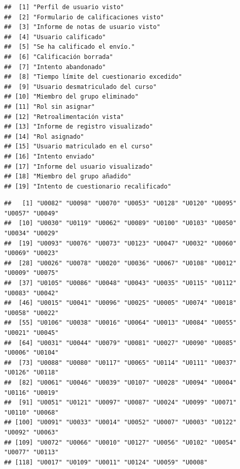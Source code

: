 \documentclass[]{elsarticle} %
\newenvironment{Shaded}{\begin{snugshade}}{\end{snugshade}}
\newcommand{\FunctionTok}[1]{\textcolor[rgb]{0.13,0.29,0.53}{\textbf{#1}}}
\newcommand{\NormalTok}[1]{#1}
\newcommand{\SpecialCharTok}[1]{\textcolor[rgb]{0.81,0.36,0.00}{\textbf{#1}}}
\newcommand{\StringTok}[1]{\textcolor[rgb]{0.31,0.60,0.02}{#1}}
\begin{document}
\begin{verbatim}
##  [1] "Perfil de usuario visto"                
##  [2] "Formulario de calificaciones visto"     
##  [3] "Informe de notas de usuario visto"      
##  [4] "Usuario calificado"                     
##  [5] "Se ha calificado el envío."             
##  [6] "Calificación borrada"                   
##  [7] "Intento abandonado"                     
##  [8] "Tiempo límite del cuestionario excedido"
##  [9] "Usuario desmatriculado del curso"       
## [10] "Miembro del grupo eliminado"            
## [11] "Rol sin asignar"                        
## [12] "Retroalimentación vista"                
## [13] "Informe de registro visualizado"        
## [14] "Rol asignado"                           
## [15] "Usuario matriculado en el curso"        
## [16] "Intento enviado"                        
## [17] "Informe del usuario visualizado"        
## [18] "Miembro del grupo añadido"              
## [19] "Intento de cuestionario recalificado"
\end{verbatim}

\begin{Shaded}
\end{Shaded}

\begin{verbatim}
##   [1] "U0082" "U0098" "U0070" "U0053" "U0128" "U0120" "U0095" "U0057" "U0049"
##  [10] "U0030" "U0119" "U0062" "U0089" "U0100" "U0103" "U0050" "U0034" "U0029"
##  [19] "U0093" "U0076" "U0073" "U0123" "U0047" "U0032" "U0060" "U0069" "U0023"
##  [28] "U0026" "U0078" "U0020" "U0036" "U0067" "U0108" "U0012" "U0009" "U0075"
##  [37] "U0105" "U0086" "U0048" "U0043" "U0035" "U0115" "U0112" "U0083" "U0042"
##  [46] "U0015" "U0041" "U0096" "U0025" "U0005" "U0074" "U0018" "U0058" "U0022"
##  [55] "U0106" "U0038" "U0016" "U0064" "U0013" "U0084" "U0055" "U0021" "U0045"
##  [64] "U0031" "U0044" "U0079" "U0081" "U0027" "U0090" "U0085" "U0006" "U0104"
##  [73] "U0088" "U0080" "U0117" "U0065" "U0114" "U0111" "U0037" "U0126" "U0118"
##  [82] "U0061" "U0046" "U0039" "U0107" "U0028" "U0094" "U0004" "U0116" "U0019"
##  [91] "U0051" "U0121" "U0097" "U0087" "U0024" "U0099" "U0071" "U0110" "U0068"
## [100] "U0091" "U0033" "U0014" "U0052" "U0007" "U0003" "U0122" "U0092" "U0063"
## [109] "U0072" "U0066" "U0010" "U0127" "U0056" "U0102" "U0054" "U0077" "U0113"
## [118] "U0017" "U0109" "U0011" "U0124" "U0059" "U0008"
\end{verbatim}
\end{document}
